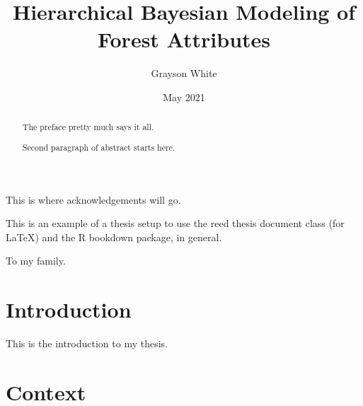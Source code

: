 \documentclass[12pt,twoside]{reedthesis}
\title{Hierarchical Bayesian Modeling of Forest Attributes}
\author{Grayson White}
\date{May 2021}
\begin{document}
  \maketitle

\frontmatter %
\pagestyle{empty} %
  \begin{acknowledgements}
    This is where acknowledgements will go.
  \end{acknowledgements}
  \begin{preface}
    This is an example of a thesis setup to use the reed thesis document class
    (for LaTeX) and the R bookdown package, in general.
  \end{preface}
  \hypersetup{linkcolor=black}
  \setcounter{tocdepth}{2}
  \tableofcontents

  \listoftables

  \listoffigures
  \begin{abstract}
    The preface pretty much says it all.
    
    \par
    
    Second paragraph of abstract starts here.
  \end{abstract}
  \begin{dedication}
    To my family.
  \end{dedication}
\mainmatter %
\pagestyle{fancyplain} %

\hypertarget{introduction}{%
\chapter*{Introduction}\label{introduction}}

This is the introduction to my thesis.

\hypertarget{context}{%
\chapter{Context}\label{context}}
\end{document}
